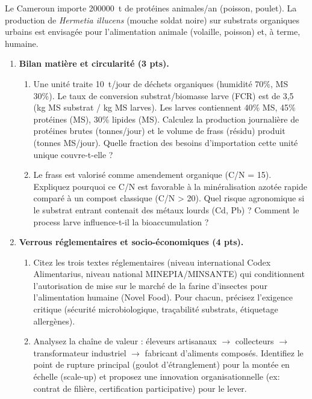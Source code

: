 \documentclass[11pt]{article}
\begin{document}
\begin{exercice}
Le Cameroun importe \SI{200000}{\tonne} de protéines animales/an (poisson, poulet). La production de \textit{Hermetia illucens} (mouche soldat noire) sur substrats organiques urbains est envisagée pour l'alimentation animale (volaille, poisson) et, à terme, humaine.

\begin{enumerate}
\item \textbf{Bilan matière et circularité (3 pts).} 
      \begin{enumerate}
      \item Une unité traite \SI{10}{\tonne/jour} de déchets organiques (humidité 70\%, MS 30\%). Le taux de conversion substrat/biomasse larve (FCR) est de 3,5 (kg MS substrat / kg MS larves). Les larves contiennent 40\% MS, 45\% protéines (MS), 30\% lipides (MS). Calculez la production journalière de protéines brutes (tonnes/jour) et le volume de frass (résidu) produit (tonnes MS/jour). Quelle fraction des besoins d'importation cette unité unique couvre-t-elle ?
      \item Le frass est valorisé comme amendement organique (C/N = 15). Expliquez pourquoi ce C/N est favorable à la minéralisation azotée rapide comparé à un compost classique (C/N > 20). Quel risque agronomique si le substrat entrant contenait des métaux lourds (Cd, Pb) ? Comment le process larve influence-t-il la bioaccumulation ?
      \end{enumerate}
\item \textbf{Verrous réglementaires et socio-économiques (4 pts).} 
      \begin{enumerate}
      \item Citez les trois textes réglementaires (niveau international Codex Alimentarius, niveau national MINEPIA/MINSANTE) qui conditionnent l'autorisation de mise sur le marché de la farine d'insectes pour l'alimentation humaine (Novel Food). Pour chacun, précisez l'exigence critique (sécurité microbiologique, traçabilité substrats, étiquetage allergènes).
      \item Analysez la chaîne de valeur : éleveurs artisanaux $\to$ collecteurs $\to$ transformateur industriel $\to$ fabricant d'aliments composés. Identifiez le point de rupture principal (goulot d'étranglement) pour la montée en échelle (scale-up) et proposez une innovation organisationnelle (ex: contrat de filière, certification participative) pour le lever.
      \end{enumerate}
\end{enumerate}
\end{exercice}
\end{document}

